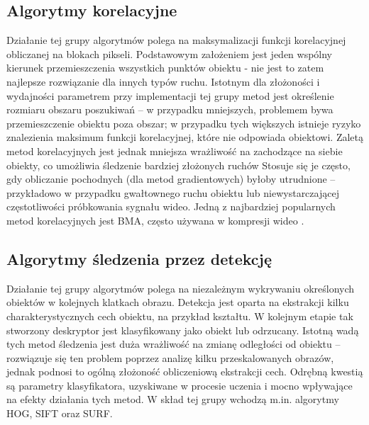 \subsection{Algorytmy korelacyjne}

Działanie tej grupy algorytmów polega na maksymalizacji funkcji korelacyjnej obliczanej na blokach pikseli. %
Podstawowym założeniem jest jeden wspólny kierunek przemieszczenia wszystkich punktów obiektu - nie jest to zatem najlepsze rozwiązanie dla innych typów ruchu. %
Istotnym dla złożoności i wydajności parametrem przy implementacji tej grupy metod jest określenie rozmiaru obszaru poszukiwań -- w przypadku mniejszych, problemem bywa przemieszczenie obiektu poza obszar; w przypadku tych większych istnieje ryzyko znalezienia maksimum funkcji korelacyjnej, które nie odpowiada obiektowi. %
Zaletą metod korelacyjnych jest jednak mniejsza wrażliwość na zachodzące na siebie obiekty, co umożliwia śledzenie bardziej złożonych ruchów %
Stosuje się je często, gdy obliczanie pochodnych (dla metod gradientowych) byłoby utrudnione -- przykładowo w przypadku gwałtownego ruchu obiektu lub niewystarczającej częstotliwości próbkowania sygnału wideo. %
Jedną z najbardziej popularnych metod korelacyjnych jest BMA, często używana w kompresji wideo \cite{Aroh}.

\subsection{Algorytmy śledzenia przez detekcję}
Działanie tej grupy algorytmów polega na niezależnym wykrywaniu określonych obiektów w kolejnych klatkach obrazu. Detekcja jest oparta na ekstrakcji kilku charakterystycznych cech obiektu, na przykład kształtu. W kolejnym etapie tak stworzony deskryptor jest klasyfikowany jako obiekt lub odrzucany. Istotną wadą tych metod śledzenia jest duża wrażliwość na zmianę odległości od obiektu -- rozwiązuje się ten problem poprzez analizę kilku przeskalowanych obrazów, jednak podnosi to ogólną złożoność obliczeniową ekstrakcji cech. Odrębną kwestią są parametry klasyfikatora, uzyskiwane w procesie uczenia i mocno wpływające na efekty działania tych metod.
W skład tej grupy wchodzą m.in. algorytmy HOG, SIFT oraz SURF.

